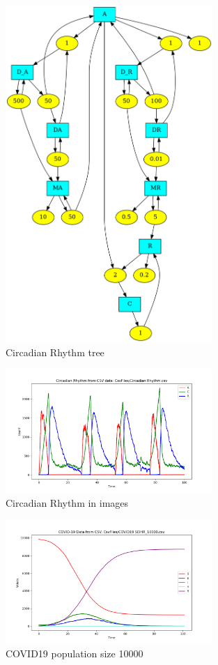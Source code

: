 \documentclass[a4paper]{article}
\begin{document}
\begin{figure}[H]
  \centering
  \includegraphics[width=0.7\textwidth]{images/Circadian_Rhythm_tree}
  \caption{Circadian Rhythm tree}
\end{figure}

\begin{figure}[H]
  \centering
  \includegraphics[width=0.7\textwidth]{images/Circadian Rhythm.png}
  \caption{Circadian Rhythm in images}
\end{figure}

\begin{figure}[H]
  \centering
  \includegraphics[width=0.7\textwidth]{images/COVID19 SEIHR_10000.png}
  \caption{COVID19 population size 10000}
\end{figure}
\end{document}
